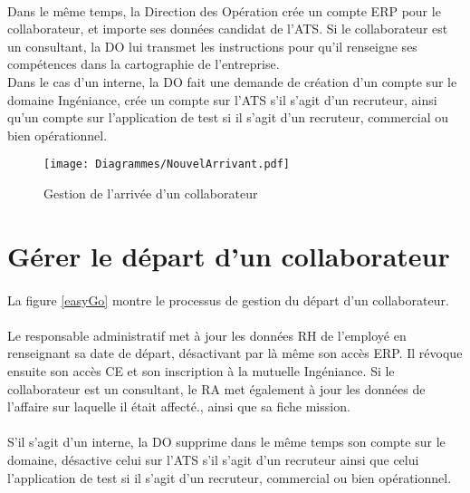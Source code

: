 \paragraph{} Dans le même temps, la Direction des Opération crée un compte ERP pour le collaborateur, et importe ses données candidat de l'ATS. Si le collaborateur est un consultant, la DO lui transmet les instructions pour qu'il renseigne ses compétences dans la cartographie de l'entreprise.\\
Dans le cas d'un interne, la DO fait une demande de création d'un compte sur le domaine Ingéniance, crée un compte sur l'ATS s'il s'agit d'un recruteur, ainsi qu'un compte sur l'application de test si il s'agit d'un recruteur, commercial ou bien opérationnel. 

\begin{figure}
	\centering
	\begin{sideways}
	\texttt{[image: Diagrammes/NouvelArrivant.pdf]}
	\end{sideways}
	\caption{Gestion de l'arrivée d'un collaborateur}
	\label{easyCome}	
\end{figure}



\section{Gérer le départ d'un collaborateur}

\paragraph{} La figure \ref{easyGo}  montre le processus de gestion du départ d'un collaborateur.
\paragraph{} Le responsable administratif met à jour les données RH de l'employé en renseignant sa date de départ, désactivant par là même son accès ERP. Il révoque ensuite son accès CE et son inscription à la mutuelle Ingéniance. Si le collaborateur est un consultant, le RA met également à jour les données de l'affaire sur laquelle il était affecté., ainsi que sa fiche mission. 
\paragraph{} S'il s'agit d'un interne, la DO supprime dans le même temps son compte sur le domaine, désactive celui sur l'ATS s'il s'agit d'un recruteur ainsi que celui l'application de test si il s'agit d'un recruteur, commercial ou bien opérationnel. 


